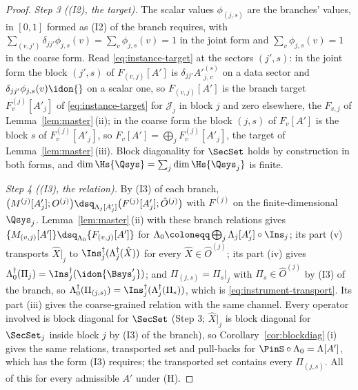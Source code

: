 \begin{proof}
\emph{Step 3 ((I2), the target).} The scalar values $\phi_{(j,s)}$ are the
branches' values,  in $[0,1]$ formed as (I2) of the branch
requires, with $\sum_{(v,j')}\delta_{jj'}\phi_{j,s}(v)=\sum_v\phi_{j,s}(v)=1$
in the joint form and $\sum_v\phi_{j,s}(v)=1$ in the coarse form. Read
\eqref{eq:instance-target} at the sectors $(j',s)$: in the joint form the
block $(j',s)$ of $F_{(v,j)}[A']$ is $\delta_{jj'}A'^{(s)}_{j,v}$ on a data
sector and $\delta_{jj'}\phi_{j,s}(v)\idon{}$ on a scalar one, so
$F_{(v,j)}[A']$ is the branch target $F^{(j)}_v[A'_j]$ of
\eqref{eq:instance-target} for $\mathcal{J}_j$ in block $j$ and zero
elsewhere, the $F_{v,j}$ of Lemma~\ref{lem:master}\,(ii); in the coarse
form the block $(j,s)$ of $F_v[A']$ is the block $s$ of $F^{(j)}_v[A'_j]$, so
$F_v[A']=\bigoplus_jF^{(j)}_v[A'_j]$, the target of
Lemma~\ref{lem:master}\,(iii). Block diagonality for $\SecSet$ holds by
construction in both forms, and $\dim\Hs{\Qsys}=\sum_j\dim\Hs{\Qsys_j}$ is
finite.

\emph{Step 4 ((I3), the relation).} By (I3) of each branch,
$\big(M^{(j)}[A'_j];O^{(j)}\big)\dsq_{\Lambda_j[A'_j]}
\big(F^{(j)}[A'_j];\hat O^{(j)}\big)$ with $F^{(j)}$ on the
finite-dimensional $\Qsys_j$. Lemma~\ref{lem:master}\,(ii) with these branch
relations gives $\{M_{(v,j)}[A']\}\dsq_{\Lambda_0}\{F_{(v,j)}[A']\}$ for
$\Lambda_0\coloneqq\bigoplus_j\Lambda_j[A'_j]\circ\Ins_j$; its part (v)
transports $\hat X|_j$ to $\Ins_j^{\dagger}(\Lambda_j^{\dagger}(\hat X))$ for
every $\hat X\in\hat O^{(j)}$; its part (iv) gives
$\Lambda_0^{\dagger}(\Pi_j)=\Ins_j^{\dagger}(\idon{\Bsys'_j})$; and
$\Pi_{(j,s)}=\Pi_s|_j$ with $\Pi_s\in\hat O^{(j)}$ by (I3) of the branch, so
$\Lambda_0^{\dagger}(\Pi_{(j,s)})=\Ins_j^{\dagger}(\Lambda_j^{\dagger}(\Pi_s))$,
which is \eqref{eq:instrument-transport}. Its part (iii) gives the
coarse-grained relation with the same channel. Every operator involved is
block diagonal for $\SecSet$ (Step 3; $\hat X|_j$ is block diagonal for
$\SecSet_j$ inside block $j$ by (I3) of the branch), so
Corollary~\ref{cor:blockdiag}\,(i) gives the same relations, transported set
and pull-backs for $\PinS\circ\Lambda_0=\Lambda[A']$, which has the form (I3)
requires; the transported set contains every $\Pi_{(j,s)}$. All of this for
every admissible $A'$ under (H).


\end{proof}
